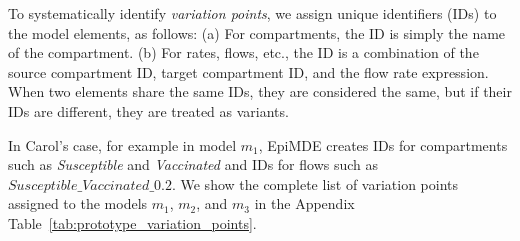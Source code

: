 To systematically identify \textit{variation points}, we assign unique identifiers (IDs) to the model elements, as follows: 
(a) For compartments, the ID is simply the name of the compartment.
(b) For rates, flows, etc., the ID is a combination of the source compartment ID, target compartment ID, and the flow rate expression.
%
When two elements share the same IDs, they are considered the same, but if their IDs are different, they are treated as variants. 

In Carol's case, for example
in model $m_1$, EpiMDE creates IDs for compartments such as \textit{Susceptible} and \textit{Vaccinated} %
and IDs for flows such as %
$Susceptible\_Vaccinated\_0.2$. 
We show the complete list of variation points assigned to the models $m_1$, $m_2$, and $m_3$ in the Appendix Table~\ref{tab:prototype_variation_points}.


